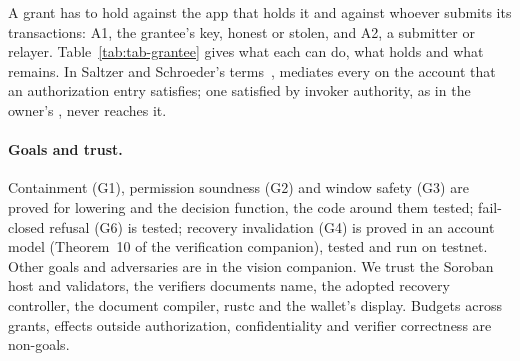 A grant has to hold against the app that holds it and against whoever submits
its transactions: A1, the grantee's key, honest or stolen, and A2, a submitter
or relayer. Table~\ref{tab:tab-grantee} gives what each can do, what holds and
what remains. In Saltzer and Schroeder's terms~\cite{saltzer-schroeder},
 mediates every  on the account that
an authorization entry satisfies; one satisfied by invoker authority, as in the
owner's , never reaches it.


\paragraph{Goals and trust.} Containment (G1), permission soundness (G2) and
window safety (G3) are proved for lowering and the decision function, the code
around them tested; fail-closed refusal (G6) is tested; recovery invalidation
(G4) is proved in an account model (Theorem~10 of the verification companion),
tested and run on testnet. Other goals and adversaries are in the vision
companion. We trust the Soroban host and validators, the verifiers documents
name, the adopted recovery controller, the document compiler, rustc
and the wallet's display. Budgets across grants, effects outside authorization,
confidentiality and verifier correctness are non-goals.

